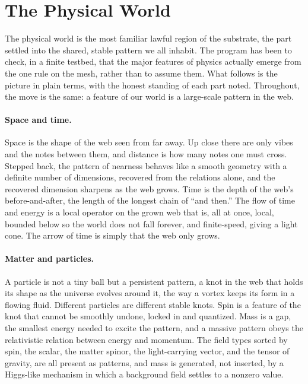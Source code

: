 \section{The Physical World}
\label{sec:physical}

The physical world is the most familiar lawful region of the substrate, the part settled into the
shared, stable pattern we all inhabit. The program has been to check, in a finite testbed, that the major features of
physics actually emerge from the one rule on the mesh, rather than to assume them. What follows
is the picture in plain terms, with the honest standing of each part noted. Throughout, the
move is the same: a feature of our world is a large-scale pattern in the web.

\paragraph{Space and time.}
Space is the shape of the web seen from far away. Up close there are only vibes and the notes
between them, and distance is how many notes one must cross. Stepped back, the pattern of nearness
behaves like a smooth geometry with a definite number of dimensions, recovered from the
relations alone, and the recovered dimension sharpens as the web grows. Time is the depth of
the web's before-and-after, the length of the longest chain of ``and then.'' The flow of time
and energy is a local operator on the grown web that is, all at once, local, bounded below so
the world does not fall forever, and finite-speed, giving a light cone. The arrow of time is
simply that the web only grows.

\paragraph{Matter and particles.}
A particle is not a tiny ball but a persistent pattern, a knot in the web that holds its shape
as the universe evolves around it, the way a vortex keeps its form in a flowing fluid. Different
particles are different stable knots. Spin is a feature of the knot that cannot be smoothly
undone, locked in and quantized. Mass is a gap, the smallest energy needed to excite the
pattern, and a massive pattern obeys the relativistic relation between energy and momentum. The
field types sorted by spin, the scalar, the matter spinor, the light-carrying vector, and the
tensor of gravity, are all present as patterns, and mass is generated, not inserted, by a
Higgs-like mechanism in which a background field settles to a nonzero value.


